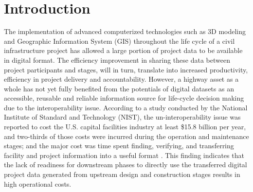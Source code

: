 \documentclass[Journal, BackFigs, DoubleSpace]{ascelike} %
\begin{document}



\section{Introduction}%
The implementation of advanced computerized technologies such as 3D modeling and Geographic Information System (GIS) throughout the life cycle of a civil infrastructure project has allowed a large portion of project data to be available in digital format. The efficiency improvement in sharing these data between project participants and stages, will in turn, translate into increased productivity, efficiency in project delivery and accountability. However, a highway asset as a whole has not yet fully benefited from the potentials of digital datasets as an accessible, reusable and reliable information source for life-cycle decision making due to the interoperability issue. According to a study conducted by the National Institute of Standard and Technology (NIST), the un-interoperability issue was reported to cost the U.S. capital facilities industry at least \$15.8 billion per year, and two-thirds of those costs were incurred during the operation and maintenance stages; and the major cost was time spent finding, verifying, and transferring facility and project information into a useful format \cite{Gallaher04}. This finding indicates that the lack of readiness for downstream phases to directly use the transferred digital project data generated from upstream design and construction stages results in high operational costs.
\par
\end{document}
